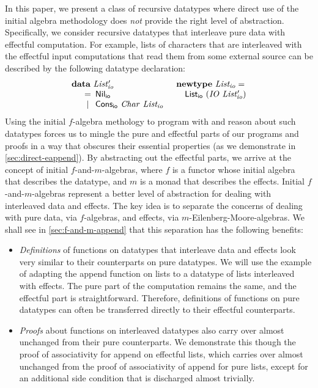 \documentclass{jfp1}
\newcommand{\kw}[1]{\textbf{#1}}
\begin{document}
In this paper, we present a class of recursive datatypes where direct
use of the initial algebra methodology does \emph{not} provide the
right level of abstraction. Specifically, we consider recursive
datatypes that interleave pure data with effectful computation. For
example, lists of characters that are interleaved with the effectful
input computations that read them from some external source can be
described by the following datatype declaration:
\begin{displaymath}\label{defn:listio}
  \begin{array}{ll}
    \kw{data}~\mathit{List'_{io}}
    &
    \kw{newtype}~\mathit{List_{io}} = 
    \\
    \quad
    \begin{array}[t]{c@{\hspace{0.5em}}l}
      = & \mathsf{Nil_{io}} \\
      | & \mathsf{Cons_{io}}~\mathit{Char}~\mathit{List_{io}} \\
    \end{array}
    &
    \quad \mathsf{List_{io}}~(\mathit{IO}~\mathit{List'_{io}})
  \end{array}
\end{displaymath}
Using the initial $f$-algebra methology to program with and reason
about such datatypes forces us to mingle the pure and effectful parts
of our programs and proofs in a way that obscures their essential
properties (as we demonstrate in \autoref{sec:direct-eappend}). By
abstracting out the effectful parts, we arrive at the concept of
initial $f$-and-$m$-algebras, where $f$ is a functor whose initial
algebra that describes the datatype, and $m$ is a monad that describes
the effects. Initial $f$-and-$m$-algebras represent a better level of
abstraction for dealing with interleaved data and effects. The key
idea is to separate the concerns of dealing with pure data, via
$f$-algebras, and effects, via $m$-Eilenberg-Moore-algebras. We shall
see in \autoref{sec:f-and-m-append} that this separation has the
following benefits:
\begin{itemize}
\item \emph{Definitions} of functions on datatypes that interleave
  data and effects look very similar to their counterparts on pure
  datatypes. We will use the example of adapting the append function
  on lists to a datatype of lists interleaved with effects. The pure
  part of the computation remains the same, and the effectful part is
  straightforward. Therefore, definitions of functions on pure
  datatypes can often be transferred directly to their effectful
  counterparts.
\item \emph{Proofs} about functions on interleaved datatypes also
  carry over almost unchanged from their pure counterparts. We
  demonstrate this though the proof of associativity for append on
  effectful lists, which carries over almost unchanged from the proof
  of associativity of append for pure lists, except for an additional
  side condition that is discharged almost trivially.
\end{itemize}
\end{document}
